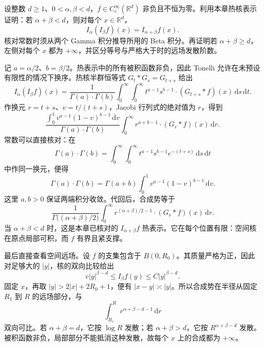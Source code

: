 \begin{exercise}\label{b2:ex:19-new-4}
设整数 \(d\geq1\)、\(0<\alpha,\beta<d\)，\(f\in C_c^\infty(\mathbb R^d)\) 非负且不恒为零。利用本章热核表示证明：若 \(\alpha+\beta<d\)，则对每个 \(x\in\mathbb R^d\)，
\[
 I_\alpha(I_\beta f)(x)=I_{\alpha+\beta}f(x).
\]
核对常数时须从两个 Gamma 积分推导所用的 Beta 积分。再证明若 \(\alpha+\beta\geq d\)，左侧对每个 \(x\) 都为 \(+\infty\)，并区分等号与严格大于时的远场发散阶数。
\end{exercise}
\begin{solution}
记 \(a=\alpha/2\)、\(b=\beta/2\)。热表示中的所有被积函数非负，因此 Tonelli 允许在未预设有限性的情况下换序。热核半群恒等式 \(G_t*G_s=G_{t+s}\) 给出
\[
 I_\alpha(I_\beta f)(x)
 =\frac1{\Gamma(a)\cdot\Gamma(b)}
   \int_0^\infty\!\int_0^\infty
       t^{a-1}s^{b-1}\cdot(G_{t+s}*f)(x)\,\mathrm ds\,\mathrm dt.
\]
作换元 \(r=t+s\)、\(v=t/(t+s)\)，Jacobi 行列式的绝对值为 \(r\)，得到
\[
 \frac{\displaystyle\int_0^1v^{a-1}(1-v)^{b-1}\,\mathrm dv}
      {\Gamma(a)\cdot\Gamma(b)}
 \int_0^\infty r^{a+b-1}\cdot(G_r*f)(x)\,\mathrm dr.
\]
常数可以直接核对：在
\[
 \Gamma(a)\cdot\Gamma(b)
 =\int_0^\infty\!\int_0^\infty
       t^{a-1}s^{b-1}e^{-(t+s)}\,\mathrm ds\,\mathrm dt
\]
中作同一换元，便得
\[
 \Gamma(a)\cdot\Gamma(b)
 =\Gamma(a+b)\int_0^1v^{a-1}(1-v)^{b-1}\,\mathrm dv.
\]
这里 \(a,b>0\) 保证两端积分收敛。代回后，合成势等于
\[
 \frac1{\Gamma\bigl((\alpha+\beta)/2\bigr)}
 \int_0^\infty r^{(\alpha+\beta)/2-1}
                         \cdot(G_r*f)(x)\,\mathrm dr.
\]
当 \(\alpha+\beta<d\) 时，这是本章已核对的 \(I_{\alpha+\beta}f\) 热表示。它在每个位置有限：空间核在原点局部可积，而 \(f\) 有界且紧支撑。

最后直接查看空间远场。设 \(f\) 的支集包含于 \(B(0,R_0)\)。其质量严格为正，因此对足够大的 \(|y|\)，核的双向比较给出
\[
 c|y|^{\beta-d}\leq I_\beta f(y)\leq C|y|^{\beta-d}.
\]
固定 \(x\)，再取 \(|y|>2|x|+2R_0+1\)，便有
\(|x-y|\asymp|y|\)。所以合成势在半径从固定 \(R_1\) 到 \(R\) 的远场部分，与
\[
 \int_{R_1}^R r^{\alpha+\beta-d-1}\,\mathrm dr
\]
双向可比。若 \(\alpha+\beta=d\)，它按 \(\log R\) 发散；若 \(\alpha+\beta>d\)，它按 \(R^{\alpha+\beta-d}\) 发散。被积函数非负，局部部分不能抵消这种发散，故每个 \(x\) 上的合成都为 \(+\infty\)。
\end{solution}

